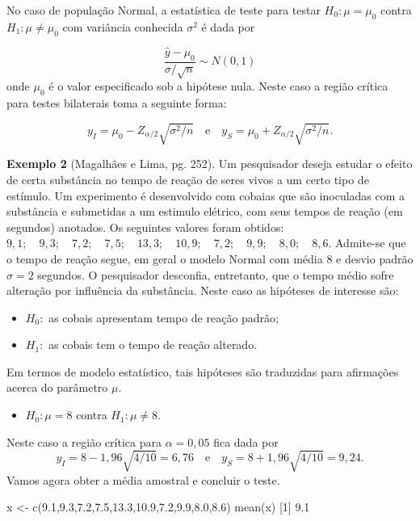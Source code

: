 \documentclass[
  10pt,
  a4paper]{book}
\newenvironment{Shaded}{\begin{snugshade}}{\end{snugshade}}
\newcommand{\DecValTok}[1]{\textcolor[rgb]{0.00,0.00,0.81}{#1}}
\newcommand{\FloatTok}[1]{\textcolor[rgb]{0.00,0.00,0.81}{#1}}
\newcommand{\FunctionTok}[1]{\textcolor[rgb]{0.00,0.00,0.00}{#1}}
\newcommand{\NormalTok}[1]{#1}
\newcommand{\OtherTok}[1]{\textcolor[rgb]{0.56,0.35,0.01}{#1}}
\providecommand{\tightlist}{%
  \setlength{\itemsep}{0pt}\setlength{\parskip}{0pt}}
\begin{document}
No caso de população Normal, a estatística de teste para testar \(H_0:\mu = \mu_0\) contra \(H_1: \mu \neq \mu_0\) com variância conhecida \(\sigma^2\) é dada por

\[
\frac{\hat{y} -  \mu_0}{\sigma/\sqrt{n}} \sim N(0,1)
\]
onde \(\mu_0\) é o valor especificado sob a hipótese nula. Neste caso a região crítica para testes bilaterais toma a seguinte forma:

\[
y_I = \mu_0 - Z_{\alpha/2} \sqrt{\sigma^2 / n}\quad \text{e} \quad y_S = \mu_0 + Z_{\alpha/2} \sqrt{\sigma^2 / n}.
\]

\textbf{Exemplo 2} (Magalhães e Lima, pg. 252). Um pesquisador deseja estudar o efeito de certa substância no tempo de reação de seres vivos a um certo tipo de estímulo. Um experimento é desenvolvido com cobaias que são inoculadas com a substância e submetidas a um estimulo elétrico, com seus tempos de reação (em segundos) anotados. Os seguintes valores foram obtidos: \(9,1;\quad 9,3;\quad 7,2;\quad 7,5;\quad 13,3;\quad 10,9;\quad 7,2;\quad 9,9;\quad 8,0;\quad 8,6\). Admite-se que o tempo de reação segue, em geral o modelo Normal com média 8 e desvio padrão \(\sigma = 2\) segundos. O pesquisador desconfia, entretanto, que o tempo médio sofre alteração por influência da substância. Neste caso as hipóteses de interesse são:

\begin{itemize}
\tightlist
\item
  \(H_0:\) as cobais apresentam tempo de reação padrão;
\item
  \(H_1:\) as cobais tem o tempo de reação alterado.
\end{itemize}

Em termos de modelo estatístico, tais hipóteses são traduzidas para afirmações acerca do parâmetro \(\mu\).

\begin{itemize}
\tightlist
\item
  \(H_0: \mu = 8\) contra \(H_1: \mu \neq 8\).
\end{itemize}

Neste caso a região crítica para \(\alpha = 0,05\) fica dada por
\[y_I = 8 - 1,96\sqrt{4/10} = 6,76 \quad \text{e} \quad y_S = 8 + 1,96 \sqrt{4/10} = 9,24.\]
Vamos agora obter a média amostral e concluir o teste.

\begin{Shaded}
\begin{Highlighting}[]
\NormalTok{x }\OtherTok{\textless{}{-}} \FunctionTok{c}\NormalTok{(}\FloatTok{9.1}\NormalTok{,}\FloatTok{9.3}\NormalTok{,}\FloatTok{7.2}\NormalTok{,}\FloatTok{7.5}\NormalTok{,}\FloatTok{13.3}\NormalTok{,}\FloatTok{10.9}\NormalTok{,}\FloatTok{7.2}\NormalTok{,}\FloatTok{9.9}\NormalTok{,}\FloatTok{8.0}\NormalTok{,}\FloatTok{8.6}\NormalTok{)}
\FunctionTok{mean}\NormalTok{(x)}
\NormalTok{[}\DecValTok{1}\NormalTok{] }\FloatTok{9.1}
\end{Highlighting}
\end{Shaded}
\end{document}

